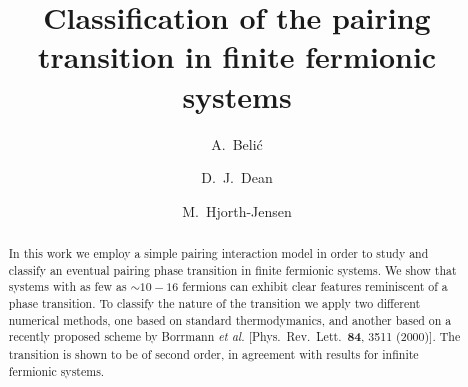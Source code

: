 


\draft

\title{Classification of the pairing transition in finite fermionic systems}
\author{A.~Beli\'c}
\address{Institute of Physics, P.O.B. 57,Belgrade 11001, Yugoslavia}  
\author{ D.~J.~Dean}
\address{Physics Division, Oak Ridge National Laboratory, P.~O.~Box 2008, Oak Ridge, Tennessee 37831}
\author{M.~Hjorth-Jensen} 
\address{Department of Physics, University of Oslo, N-0316 Oslo, Norway}

\maketitle

\begin{abstract}
In this work we employ a simple pairing interaction
model in order to study and classify an 
eventual pairing phase transition in finite
fermionic systems. 
We show that systems with as few as $\sim 10-16$ fermions 
can exhibit clear features reminiscent of a phase transition. 
To classify the nature of the transition we apply two different
numerical methods, one based on standard thermodymanics, and another based on 
a recently  proposed scheme by Borrmann {\em et al.}
[Phys.~Rev.~Lett.~{\bf 84}, 3511 (2000)].
The transition is shown to be of second order, in agreement with 
results for infinite fermionic systems.

\end{abstract}

